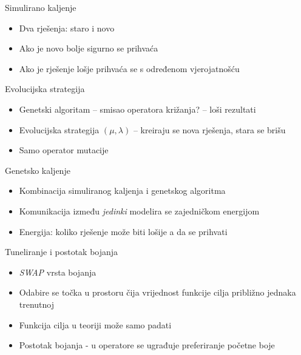 \documentclass[utf8]{beamer}
\begin{document}
\begin{frame}{Simulirano kaljenje}
	\begin{itemize}
		\item Dva rješenja: staro i novo
		\pause
		\item Ako je novo bolje sigurno se prihvaća
		\pause
		\item Ako je rješenje lošje prihvaća se s određenom vjerojatnošću
	\end{itemize}
\end{frame}

\begin{frame}{Evolucijska strategija}
	\begin{itemize}
		\item Genetski algoritam -- smisao operatora križanja? -- loši rezultati
		\pause
		\item Evolucijska strategija $(\mu, \lambda)$ -- kreiraju se nova rješenja, stara se brišu
		\pause
		\item Samo operator mutacije
		\end{itemize}
\end{frame}

\begin{frame}{Genetsko kaljenje}
	\begin{itemize}
		\item Kombinacija simuliranog kaljenja i genetskog algoritma
		\pause
		\item Komunikacija između \emph{jedinki} modelira se zajedničkom energijom
		\pause
		\item Energija: koliko rješenje može biti lošije a da se prihvati
	\end{itemize}
\end{frame}


\begin{frame}{Tuneliranje i postotak bojanja}
	\begin{itemize}
		\item \emph{SWAP} vrsta bojanja
		\pause
		\item Odabire se točka u prostoru čija vrijednost funkcije cilja približno jednaka trenutnoj
		\pause
		\item Funkcija cilja u teoriji može samo padati
		\pause
		\item Postotak bojanja - u operatore se ugrađuje preferiranje početne boje
	\end{itemize}
\end{frame}
\end{document}
